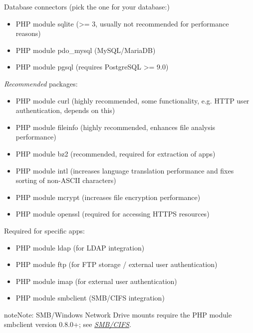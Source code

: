 \documentclass[letterpaper,10pt,english]{sphinxmanual}
\begin{document}
Database connectors (pick the one for your database:)
\begin{itemize}
\item {} 
PHP module sqlite (\textgreater{}= 3, usually not recommended for performance reasons)

\item {} 
PHP module pdo\_mysql (MySQL/MariaDB)

\item {} 
PHP module pgsql (requires PostgreSQL \textgreater{}= 9.0)

\end{itemize}

\emph{Recommended} packages:
\begin{itemize}
\item {} 
PHP module curl (highly recommended, some functionality, e.g. HTTP user
authentication, depends on this)

\item {} 
PHP module fileinfo (highly recommended, enhances file analysis performance)

\item {} 
PHP module bz2 (recommended, required for extraction of apps)

\item {} 
PHP module intl (increases language translation performance and fixes sorting
of non-ASCII characters)

\item {} 
PHP module mcrypt (increases file encryption performance)

\item {} 
PHP module openssl (required for accessing HTTPS resources)

\end{itemize}

Required for specific apps:
\begin{itemize}
\item {} 
PHP module ldap (for LDAP integration)

\item {} 
PHP module ftp (for FTP storage / external user authentication)

\item {} 
PHP module imap (for external user authentication)

\item {} 
PHP module smbclient  (SMB/CIFS integration)

\end{itemize}

\begin{notice}{note}{Note:}
SMB/Windows Network Drive mounts require the PHP module smbclient version 0.8.0+; see
{\hyperref[configuration_files/external_storage/smb::doc]{\emph{\emph{SMB/CIFS}}}}.
\end{notice}
\end{document}
